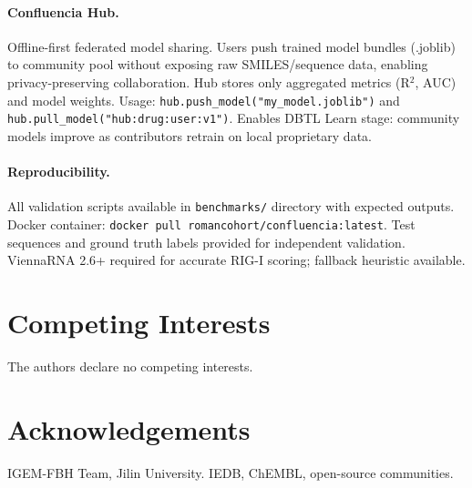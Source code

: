 \paragraph{Confluencia Hub.}
Offline-first federated model sharing. Users push trained model bundles (.joblib) to community pool without exposing raw SMILES/sequence data, enabling privacy-preserving collaboration. Hub stores only aggregated metrics (R$^2$, AUC) and model weights. Usage: \texttt{hub.push\_model("my\_model.joblib")} and \texttt{hub.pull\_model("hub:drug:user:v1")}. Enables DBTL Learn stage: community models improve as contributors retrain on local proprietary data.

\paragraph{Reproducibility.}
All validation scripts available in \texttt{benchmarks/} directory with expected outputs. Docker container: \texttt{docker pull romancohort/confluencia:latest}. Test sequences and ground truth labels provided for independent validation. ViennaRNA 2.6+ required for accurate RIG-I scoring; fallback heuristic available.

\section*{Competing Interests}

The authors declare no competing interests.

\section*{Acknowledgements}

IGEM-FBH Team, Jilin University. IEDB, ChEMBL, open-source communities.
